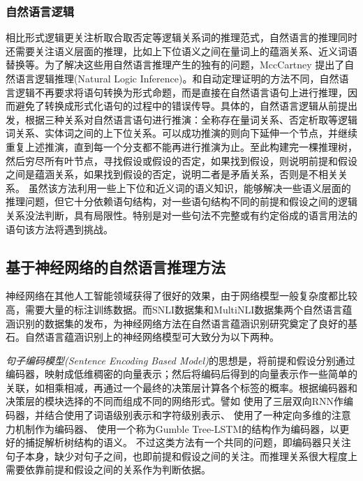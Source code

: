 \documentclass[UTF8,11pt,a4paper,nofonts]{ctexart}
\numberwithin{equation}{section}
\begin{document}
\subsubsection{自然语言逻辑}


相比形式逻辑更关注析取合取否定等逻辑关系词的推理范式，自然语言的推理同时还需要关注语义层面的推理，比如上下位语义之间在量词上的蕴涵关系、近义词语替换等。为了解决这些用自然语言推理产生的独有的问题，MccCartney 提出了自然语言逻辑推理(Natural Logic Inference)\cite{MacCartney2007NaturalLF, Angeli2014NaturalLINL}。和自动定理证明的方法不同，自然语言逻辑不再要求将语句转换为形式命题，而是直接在自然语言语句上进行推理，因而避免了转换成形式化语句的过程中的错误传导。具体的，自然语言逻辑从前提出发，根据三种关系对自然语言语句进行推演：全称存在量词关系、否定析取等逻辑词关系、实体词之间的上下位关系。可以成功推演的则向下延伸一个节点，并继续重复上述推演，直到每一个分支都不能再进行推演为止。至此构建完一棵推理树，然后穷尽所有叶节点，寻找假设或假设的否定，如果找到假设，则说明前提和假设之间是蕴涵关系，如果找到假设的否定，说明二者是矛盾关系，否则是不相关关系。
虽然该方法利用一些上下位和近义词的语义知识，能够解决一些语义层面的推理问题，但它十分依赖语句结构，对一些语句结构不同的前提和假设之间的逻辑关系没法判断，具有局限性。特别是对一些句法不完整或有约定俗成的语言用法的语句该方法将遇到挑战。




\subsection{基于神经网络的自然语言推理方法}

神经网络在其他人工智能领域获得了很好的效果，由于网络模型一般复杂度都比较高，需要大量的标注训练数据。而SNLI数据集\cite{Bowman2015ALA}和MultiNLI数据集\cite{Nangia2017TheR2}两个自然语言蕴涵识别的数据集的发布，为神经网络方法在自然语言蕴涵识别研究奠定了良好的基石。自然语言蕴涵识别上的神经网络模型可大致分为以下两种。

\textit{句子编码模型(Sentence Encoding Based Model)}\cite{Conneau2017SupervisedLO, Yu2017NeuralSE, Chen2017RecurrentNN, Shen2017DiSAN, Choi2017LearningTC}的思想是，将前提和假设分别通过编码器，映射成低维稠密的向量表示；然后将编码后得到的向量表示作一些简单的关联，如相乘相减，再通过一个最终的决策层计算各个标签的概率。根据编码器和决策层的模块选择的不同而组成不同的网络形式。譬如
\cite{Chen2017RecurrentNN}使用了三层双向RNN作编码器，并结合使用了词语级别表示和字符级别表示、
\cite{Shen2017DiSAN}使用了一种定向多维的注意力机制作为编码器、
\cite{Choi2017LearningTC}使用一个称为Gumble Tree-LSTM的结构作为编码器，以更好的捕捉解析树结构的语义。
不过这类方法有一个共同的问题，即编码器只关注句子本身，缺少对句子之间，也即前提和假设之间的关注。而推理关系很大程度上需要依靠前提和假设之间的关系作为判断依据。
\end{document}
